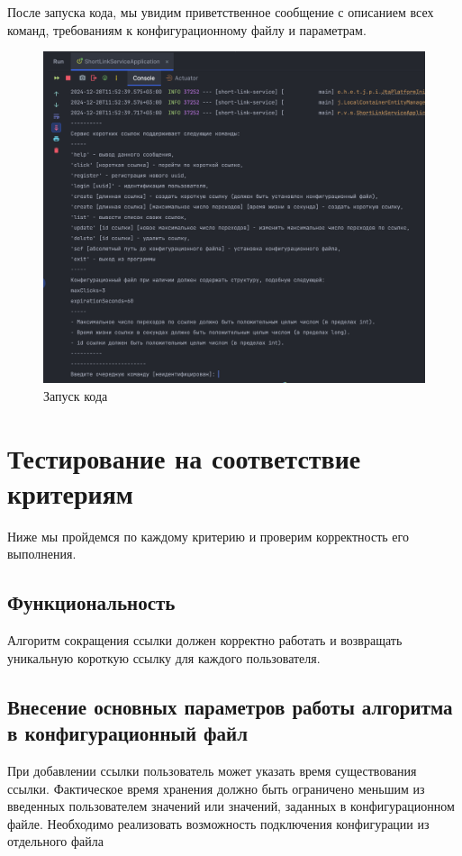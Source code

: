 \documentclass[a4paper, 14pt]{article}
\begin{document}
После запуска кода, мы увидим приветственное сообщение с описанием всех команд, требованиям к конфигурационному файлу и параметрам.


\begin{figure}[H]
	\centering
	\includegraphics[width=17cm]{resources/2.png}
	\caption{Запуск кода}
\end{figure}

\newpage
\section{Тестирование на соответствие критериям}

Ниже мы пройдемся по каждому критерию и проверим корректность его выполнения.

\subsection{Функциональность}

Алгоритм сокращения ссылки должен корректно работать и возвращать уникальную короткую ссылку для каждого пользователя.

\subsection{Внесение основных параметров работы алгоритма в конфигурационный файл}

При добавлении ссылки пользователь может указать время существования ссылки. Фактическое время хранения должно быть ограничено меньшим из введенных пользователем значений или значений, заданных в конфигурационном файле. Необходимо реализовать возможность подключения конфигурации из отдельного файла
\end{document}
